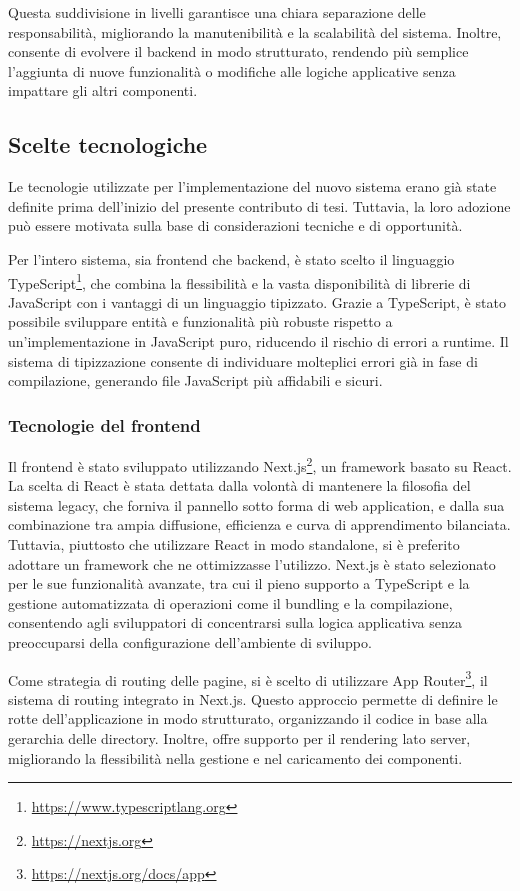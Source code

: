 Questa suddivisione in livelli garantisce una chiara separazione delle responsabilità, migliorando la manutenibilità e la scalabilità del sistema. Inoltre, consente di evolvere il backend in modo strutturato, rendendo più semplice l'aggiunta di nuove funzionalità o modifiche alle logiche applicative senza impattare gli altri componenti.

\subsection{Scelte tecnologiche}
Le tecnologie utilizzate per l'implementazione del nuovo sistema erano già state definite prima dell'inizio del presente contributo di tesi. Tuttavia, la loro adozione può essere motivata sulla base di considerazioni tecniche e di opportunità.

Per l'intero sistema, sia frontend che backend, è stato scelto il linguaggio TypeScript\footnote{\url{https://www.typescriptlang.org}}, che combina la flessibilità e la vasta disponibilità di librerie di JavaScript con i vantaggi di un linguaggio tipizzato. Grazie a TypeScript, è stato possibile sviluppare entità e funzionalità più robuste rispetto a un'implementazione in JavaScript puro, riducendo il rischio di errori a runtime. Il sistema di tipizzazione consente di individuare molteplici errori già in fase di compilazione, generando file JavaScript più affidabili e sicuri.

\subsubsection{Tecnologie del frontend}
Il frontend è stato sviluppato utilizzando Next.js\footnote{\url{https://nextjs.org}}, un framework basato su React. La scelta di React è stata dettata dalla volontà di mantenere la filosofia del sistema legacy, che forniva il pannello sotto forma di web application, e dalla sua combinazione tra ampia diffusione, efficienza e curva di apprendimento bilanciata. Tuttavia, piuttosto che utilizzare React in modo standalone, si è preferito adottare un framework che ne ottimizzasse l’utilizzo. Next.js è stato selezionato per le sue funzionalità avanzate, tra cui il pieno supporto a TypeScript e la gestione automatizzata di operazioni come il bundling e la compilazione, consentendo agli sviluppatori di concentrarsi sulla logica applicativa senza preoccuparsi della configurazione dell'ambiente di sviluppo.

Come strategia di routing delle pagine, si è scelto di utilizzare App Router\footnote{\url{https://nextjs.org/docs/app}}, il sistema di routing integrato in Next.js. Questo approccio permette di definire le rotte dell'applicazione in modo strutturato, organizzando il codice in base alla gerarchia delle directory. Inoltre, offre supporto per il rendering lato server, migliorando la flessibilità nella gestione e nel caricamento dei componenti.

